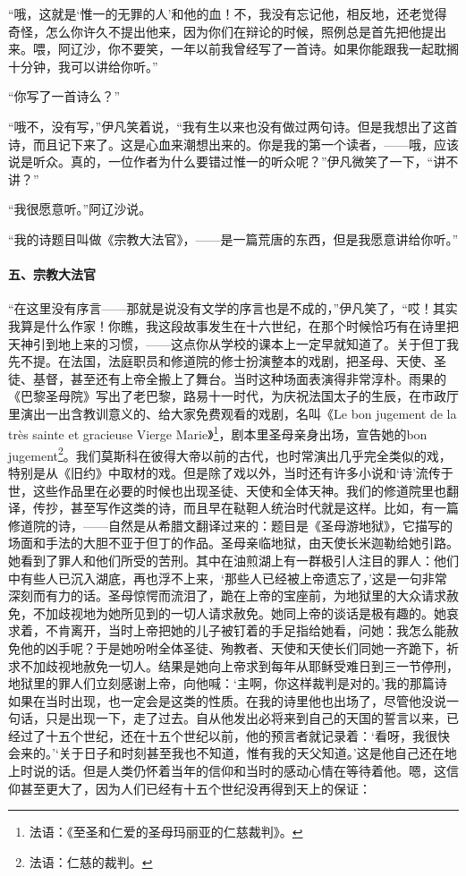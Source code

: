 \par “哦，这就是‘惟一的无罪的人’和他的血！不，我没有忘记他，相反地，还老觉得奇怪，怎么你许久不提出他来，因为你们在辩论的时候，照例总是首先把他提出来。喂，阿辽沙，你不要笑，一年以前我曾经写了一首诗。如果你能跟我一起耽搁十分钟，我可以讲给你听。”
\par “你写了一首诗么？”
\par “哦不，没有写，”伊凡笑着说，“我有生以来也没有做过两句诗。但是我想出了这首诗，而且记下来了。这是心血来潮想出来的。你是我的第一个读者，——哦，应该说是听众。真的，一位作者为什么要错过惟一的听众呢？”伊凡微笑了一下，“讲不讲？”
\par “我很愿意听。”阿辽沙说。
\par “我的诗题目叫做《宗教大法官》，——是一篇荒唐的东西，但是我愿意讲给你听。”
\paragraph*{五、宗教大法官}
\par “在这里没有序言——那就是说没有文学的序言也是不成的，”伊凡笑了，“哎！其实我算是什么作家！你瞧，我这段故事发生在十六世纪，在那个时候恰巧有在诗里把天神引到地上来的习惯，——这点你从学校的课本上一定早就知道了。关于但丁我先不提。在法国，法庭职员和修道院的修士扮演整本的戏剧，把圣母、天使、圣徒、基督，甚至还有上帝全搬上了舞台。当时这种场面表演得非常淳朴。雨果的《巴黎圣母院》写出了老巴黎，路易十一时代，为庆祝法国太子的生辰，在市政厅里演出一出含教训意义的、给大家免费观看的戏剧，名叫《Le bon jugement de la très sainte et gracieuse Vierge Marie》\footnote{法语：《至圣和仁爱的圣母玛丽亚的仁慈裁判》。}，剧本里圣母亲身出场，宣告她的bon jugement\footnote{法语：仁慈的裁判。}。我们莫斯科在彼得大帝以前的古代，也时常演出几乎完全类似的戏，特别是从《旧约》中取材的戏。但是除了戏以外，当时还有许多小说和‘诗’流传于世，这些作品里在必要的时候也出现圣徒、天使和全体天神。我们的修道院里也翻译，传抄，甚至写作这类的诗，而且早在鞑靼人统治时代就是这样。比如，有一篇修道院的诗，——自然是从希腊文翻译过来的：题目是《圣母游地狱》，它描写的场面和手法的大胆不亚于但丁的作品。圣母亲临地狱，由天使长米迦勒给她引路。她看到了罪人和他们所受的苦刑。其中在油煎湖上有一群极引人注目的罪人：他们中有些人已沉入湖底，再也浮不上来，‘那些人已经被上帝遗忘了，’这是一句非常深刻而有力的话。圣母惊愕而流泪了，跪在上帝的宝座前，为地狱里的大众请求赦免，不加歧视地为她所见到的一切人请求赦免。她同上帝的谈话是极有趣的。她哀求着，不肯离开，当时上帝把她的儿子被钉着的手足指给她看，问她：我怎么能赦免他的凶手呢？于是她吩咐全体圣徒、殉教者、天使和天使长们同她一齐跪下，祈求不加歧视地赦免一切人。结果是她向上帝求到每年从耶稣受难日到三一节停刑，地狱里的罪人们立刻感谢上帝，向他喊：‘主啊，你这样裁判是对的。’我的那篇诗如果在当时出现，也一定会是这类的性质。在我的诗里他也出场了，尽管他没说一句话，只是出现一下，走了过去。自从他发出必将来到自己的天国的誓言以来，已经过了十五个世纪，还在十五个世纪以前，他的预言者就记录着：‘看呀，我很快会来的。’‘关于日子和时刻甚至我也不知道，惟有我的天父知道。’这是他自己还在地上时说的话。但是人类仍怀着当年的信仰和当时的感动心情在等待着他。嗯，这信仰甚至更大了，因为人们已经有十五个世纪没再得到天上的保证：
